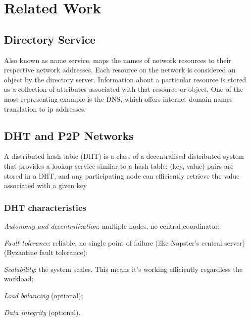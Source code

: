 \chapter{Related Work}
\label{chapter:related_work}

\section{Directory Service}
Also known as name service, maps the names of network resources to their respective network addresses. Each resource on the network is considered an object by the directory server. Information about a particular resource is stored as a collection of attributes associated with that resource or object. One of the most representing example is the DNS, which offers internet domain names translation to ip addresses.

\section{DHT and P2P Networks}
A distributed hash table (DHT) is a class of a decentralised distributed system that provides a lookup service similar to a hash table: (key, value) pairs are stored in a DHT, and any participating node can efficiently retrieve the value associated with a given key

\subsection{DHT characteristics}
\begin{list}{}{}
\item \emph{Autonomy and decentralization}: multiple nodes, no central coordinator;
\item \emph{Fault tolerance}: reliable, no single point of failure (like Napster’s central server) (Byzantine fault tolerance);
\item \emph{Scalability}: the system scales. This means it’s working efficiently regardless the workload;
\item \emph{Load balancing} (optional);
\item \emph{Data integrity} (optional).
\end{list}


